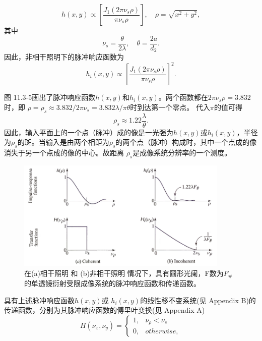 \documentclass[UTF8]{ctexart}
\numberwithin{figure}{subsection}
\numberwithin{table}{subsection}
\begin{document}
\begin{equation}
h(x,y) \propto [\frac{J_1 (2\pi\nu_s \rho)}{\pi\nu_s \rho}] , \quad \rho = \sqrt{x^2 + y^2} ,
\end{equation}
其中
\begin{equation}
\nu_s = \frac{\theta}{2 \lambda} , \quad \theta = \frac{2a}{d_2} .
\end{equation}
因此，非相干照明下的脉冲响应函数为
\begin{equation}
h_i (x,y) \propto [\frac{J_1 (2\pi\nu_s \rho)}{\pi\nu_s \rho}]^2 .
\end{equation}
\par 图 11.3-5画出了脉冲响应函数$h(x,y)$和$h_i (x,y)$。两个函数都在$2\pi \nu_s \rho = 3.832$时，即 $\rho = \rho_s \approx 3.832 / 2\pi \nu_s = 3.832\lambda / \pi\theta$时到达第一个零点。 代入$\pi$的值可得
\begin{equation}
\rho_s \approx 1.22 \frac{\lambda}{\theta} .
\end{equation}
因此，输入平面上的一个点（脉冲）成的像是一光强为$h (x,y)$或$h_i (x,y)$，半径为$\rho_s$的斑。当输入是由两个相距为$\rho_s$的两个点（脉冲）构成时，其中一个点成的像消失于另一个点成的像的中心。故距离 $\rho_s$是成像系统分辨率的一个测度。
\begin{figure}[H]
\centering
\includegraphics[width=0.9\textwidth]{11_3_5.PNG}
\caption{在(a)相干照明  和 (b)非相干照明 情况下，具有圆形光阑，F数为$F_\#$的单透镜衍射受限成像系统的脉冲响应函数和传递函数。}
\label{fig: 11_3_5}
\end{figure}
\par 具有上述脉冲响应函数$h(x,y)$或 $h_i (x,y)$的线性移不变系统(见 Appendix B)的传递函数，分别为其脉冲响应函数的傅里叶变换(见 Appendix A)
\begin{equation}
H(\nu_x, \nu_y) =
\begin{cases}
1, & \nu_\rho < \nu_s \\
0, & otherwise,
\end{cases}
\end{equation}
\end{document}
